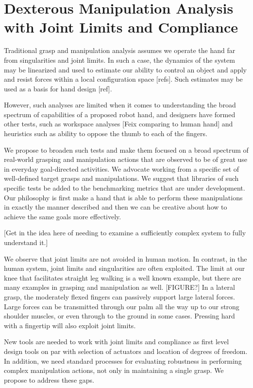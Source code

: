 \section{Dexterous Manipulation Analysis with Joint Limits and Compliance}

Traditional grasp and manipulation analysis assumes we operate the hand far from singularities and joint limits.	   In such a case, the dynamics of the system may be linearized and used to estimate our ability to control an object and apply and resist forces within a local configuration space [refs].   Such estimates may be used as a basis for hand design [ref].

However, such analyses are limited when it comes to understanding the broad spectrum of capabilities of a proposed robot hand, and designers have formed other tests, such as workspace analyses [Feix comparing to human hand] and heuristics such as ability to oppose the thumb to each of the fingers.

We propose to broaden such tests and make them focused on a broad spectrum of real-world grasping and manipulation actions that are observed to be of great use in everyday goal-directed activities.   We advocate working from a specific set of well-defined target grasps and manipulations.    We suggest that libraries of such specific tests be added to the benchmarking metrics that are under development.   Our philosophy is first make a hand that is able to perform these manipulations in exactly the manner described and then we can be creative about how to achieve the same goals more effectively.  

[Get in the idea here of needing to examine a sufficiently complex system to fully understand it.]

We observe that joint limits are not avoided in human motion.   In contrast, in the human system, joint limits and singularities are often exploited.    The limit at our knee that facilitates straight leg walking is a well known example, but there are many examples in grasping and manipulation as well.   [FIGURE?]   In a lateral grasp, the moderately flexed fingers can passively support large lateral forces.   Large forces can be transmitted through our palm all the way up to our strong shoulder muscles, or even through to the ground in some cases.   Pressing hard with a fingertip will also exploit joint limits.

New tools are needed to work with joint limits and compliance as first level design tools on par with selection of actuators and location of degrees of freedom.     In addition, we need standard processes for evaluating robustness in performing complex manipulation actions, not only in maintaining a single grasp.  We propose to address these gaps.

